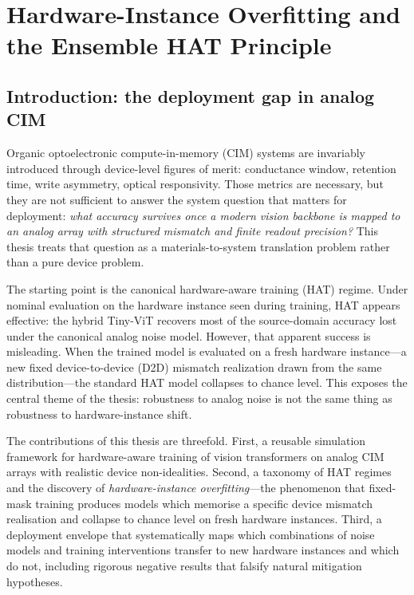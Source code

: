 
\chapter{Hardware-Instance Overfitting and the Ensemble HAT Principle}
\label{chap:hat-instance-overfitting}

\section{Introduction: the deployment gap in analog CIM}

Organic optoelectronic compute-in-memory (CIM) systems are invariably introduced through device-level figures of merit: conductance window, retention time, write asymmetry, optical responsivity.  Those metrics are necessary, but they are not sufficient to answer the system question that matters for deployment: \emph{what accuracy survives once a modern vision backbone is mapped to an analog array with structured mismatch and finite readout precision?}  This thesis treats that question as a materials-to-system translation problem rather than a pure device problem.

The starting point is the canonical hardware-aware training (HAT) regime.  Under nominal evaluation on the hardware instance seen during training, HAT appears effective: the hybrid Tiny-ViT recovers most of the source-domain accuracy lost under the canonical analog noise model.  However, that apparent success is misleading.  When the trained model is evaluated on a fresh hardware instance---a new fixed device-to-device (D2D) mismatch realization drawn from the same distribution---the standard HAT model collapses to chance level.  This exposes the central theme of the thesis: robustness to analog noise is not the same thing as robustness to hardware-instance shift.

The contributions of this thesis are threefold.  First, a reusable simulation framework for hardware-aware training of vision transformers on analog CIM arrays with realistic device non-idealities.  Second, a taxonomy of HAT regimes and the discovery of \emph{hardware-instance overfitting}---the phenomenon that fixed-mask training produces models which memorise a specific device mismatch realisation and collapse to chance level on fresh hardware instances.  Third, a deployment envelope that systematically maps which combinations of noise models and training interventions transfer to new hardware instances and which do not, including rigorous negative results that falsify natural mitigation hypotheses.

